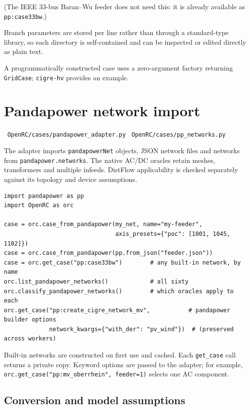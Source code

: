 \documentclass[11pt,a4paper]{report}
\newcommand{\code}[1]{\texttt{\small #1}}
\newcommand{\file}[1]{\texttt{\small\color{nbgrey} #1}}
\begin{document}
(The IEEE 33-bus Baran--Wu feeder does not need this: it is already available
as \code{pp:case33bw}.)

Branch parameters are stored per line rather than through a standard-type
library, so each directory is self-contained and can be inspected or edited
directly as plain text.

A programmatically constructed case uses a zero-argument factory returning
\code{GridCase}; \code{cigre-hv} provides an example.

\chapter{Pandapower network import}
\label{ch:pandapower}

\file{OpenRC/cases/pandapower\_adapter.py} \quad
\file{OpenRC/cases/pp\_networks.py}

The adapter imports \code{pandapowerNet} objects, JSON network files and
networks from \code{pandapower.networks}. The native AC/DC oracles retain
meshes, transformers and multiple infeeds. DistFlow applicability is checked
separately against its topology and device assumptions.

\begin{lstlisting}
import pandapower as pp
import OpenRC as orc

case = orc.case_from_pandapower(my_net, name="my-feeder",
                                axis_presets={"poc": [1001, 1045, 1102]})
case = orc.case_from_pandapower(pp.from_json("feeder.json"))
case = orc.get_case("pp:case33bw")        # any built-in network, by name
orc.list_pandapower_networks()            # all sixty
orc.classify_pandapower_networks()        # which oracles apply to each
orc.get_case("pp:create_cigre_network_mv",           # pandapower builder options
             network_kwargs={"with_der": "pv_wind"})  # (preserved across workers)
\end{lstlisting}

Built-in networks are constructed on first use and cached. Each
\code{get\_case} call returns a private copy. Keyword options are passed to
the adapter; for example, \code{orc.get\_case("pp:mv\_oberrhein", feeder=1)}
selects one AC component.

\section{Conversion and model assumptions}
\end{document}
